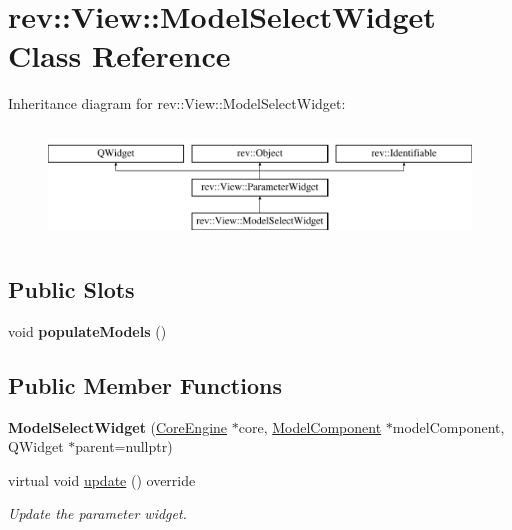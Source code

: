 \hypertarget{classrev_1_1_view_1_1_model_select_widget}{}\section{rev\+::View\+::Model\+Select\+Widget Class Reference}
\label{classrev_1_1_view_1_1_model_select_widget}
Inheritance diagram for rev\+::View\+::Model\+Select\+Widget\+:\begin{figure}[H]
\begin{center}
\leavevmode
\includegraphics[height=2.994653cm]{classrev_1_1_view_1_1_model_select_widget}
\end{center}
\end{figure}
\subsection*{Public Slots}
\begin{DoxyCompactItemize}
\item 
\mbox{\label{classrev_1_1_view_1_1_model_select_widget_a75f0d3cd859d363574eec4426b7dd3ba}} 
void {\bfseries populate\+Models} ()
\end{DoxyCompactItemize}
\subsection*{Public Member Functions}
\begin{DoxyCompactItemize}
\item 
\mbox{\label{classrev_1_1_view_1_1_model_select_widget_aa142554d077af510545f9db75b44b279}} 
{\bfseries Model\+Select\+Widget} (\mbox{\hyperlink{classrev_1_1_core_engine}{Core\+Engine}} $\ast$core, \mbox{\hyperlink{classrev_1_1_model_component}{Model\+Component}} $\ast$model\+Component, Q\+Widget $\ast$parent=nullptr)
\item 
\mbox{\label{classrev_1_1_view_1_1_model_select_widget_a013e3ef11b163719b1030f87742e69b0}} 
virtual void \mbox{\hyperlink{classrev_1_1_view_1_1_model_select_widget_a013e3ef11b163719b1030f87742e69b0}{update}} () override
\begin{DoxyCompactList}\small\item\em Update the parameter widget. \end{DoxyCompactList}\end{DoxyCompactItemize}
